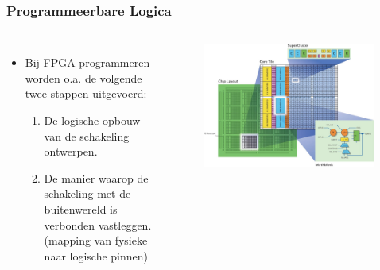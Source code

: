 \documentclass{beamer}
\begin{document}
\begin{frame} 
\frametitle{Programmeerbare Logica}
\begin{columns}[c] 
  \begin{itemize}[<+->]
    \item Bij FPGA programmeren worden o.a. de volgende twee stappen uitgevoerd:
    \begin{enumerate}
     \item De logische opbouw van de schakeling ontwerpen.
     \item De manier waarop de schakeling met de buitenwereld is verbonden vastleggen. (mapping van fysieke naar logische pinnen)
     \end{enumerate}
   \end{itemize} 
  \begin{figure}[h]
  \includegraphics[width=0.99\textwidth]{images/fpga2.jpg}
  \end{figure}
\end{columns}
\end{frame}

\end{document}
